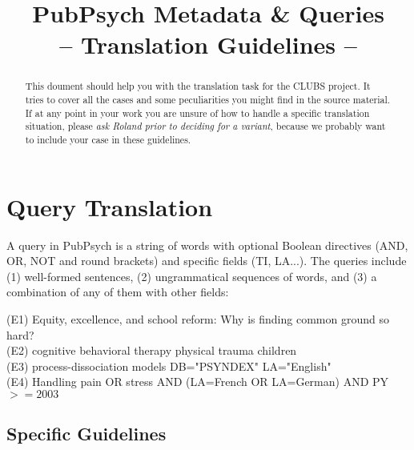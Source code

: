 \documentclass[a4paper,10pt]{article}
\title{PubPsych Metadata \& Queries \\ -- Translation Guidelines --}
\author{}
\newcommand{\exTit}[1]{\begin{tcolorbox}[enhanced,attach boxed title to top center={yshift=-3mm,yshifttext=-1mm},title=Examples,coltitle=black,colbacktitle=white]{#1}\end{tcolorbox}}
\begin{document}
\maketitle

 \begin{abstract}
 	This doument should help you with the translation task for the CLUBS project. It tries to cover all the cases and some peculiarities you might find in the source material. If at any point in your work you are unsure of how to handle a specific translation situation, please \emph{ask Roland prior to deciding for a variant}, because we probably want to include your case in these guidelines. 
 \end{abstract}

\section{Query Translation}
\label{s:queries}
A query in PubPsych is a string of words with optional Boolean directives (AND, OR, NOT and round brackets) and specific fields (TI, LA...). 
The queries include (1) well-formed sentences, (2) ungrammatical sequences of words, and (3) a combination of any of them with other fields:


\medskip
\exTit{(E1) Equity, excellence, and school reform: Why is finding common ground so hard? \\
(E2) cognitive behavioral therapy physical trauma children \\
(E3) process-dissociation models DB="PSYNDEX" LA="English" \\
(E4) Handling pain OR stress AND (LA=French OR LA=German) AND PY$>=2003$}



\subsection{Specific Guidelines}
\label{ss:q_guidelines}
\end{document}
